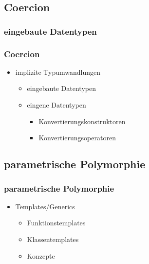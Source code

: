 \documentclass{beamer}
\begin{document}
{{	
	\subsection{Coercion}
	\subsubsection{eingebaute Datentypen}
	{
	\begin{frame}
		\frametitle{Coercion}
		\begin{itemize}
			\item implizite Typumwandlungen
			\begin{itemize}
				\UseRawInputEncoding
				
				\pause\item eingebaute Datentypen
					{\tiny}
				\pause\item eingene Datentypen
				\begin{itemize}
					\pause\item Konvertierungskonstruktoren
						{\tiny}
					\pause\item Konvertierungsoperatoren
						{\tiny}
				\end{itemize}
			\end{itemize}
		\end{itemize}
	\end{frame}
	}
	
	
	\subsection{parametrische Polymorphie}
	\begin{frame}
		\frametitle{parametrische Polymorphie}
		\begin{itemize}
			\item Templates/Generics
			\begin{itemize}
				\item Funktionstemplates
				\item Klassentemplates
				\item Konzepte
			\end{itemize}
		\end{itemize}
	\end{frame}
	
}}
\end{document}
